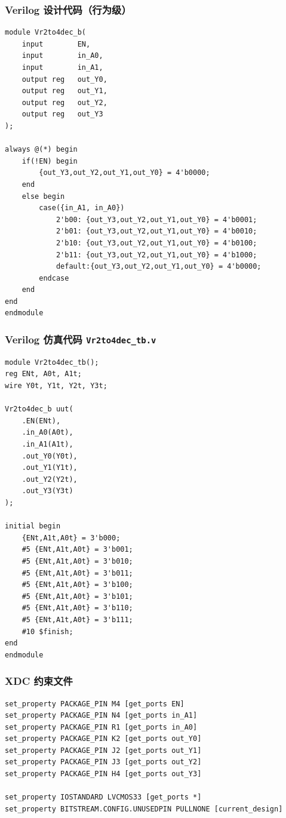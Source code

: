 \documentclass[11pt,a4paper]{article}
\begin{document}
\subsubsection{Verilog 设计代码（行为级）}
\begin{lstlisting}
module Vr2to4dec_b(
    input        EN,
    input        in_A0,
    input        in_A1,
    output reg   out_Y0,
    output reg   out_Y1,
    output reg   out_Y2,
    output reg   out_Y3
);

always @(*) begin
    if(!EN) begin
        {out_Y3,out_Y2,out_Y1,out_Y0} = 4'b0000;
    end
    else begin
        case({in_A1, in_A0})
            2'b00: {out_Y3,out_Y2,out_Y1,out_Y0} = 4'b0001;
            2'b01: {out_Y3,out_Y2,out_Y1,out_Y0} = 4'b0010;
            2'b10: {out_Y3,out_Y2,out_Y1,out_Y0} = 4'b0100;
            2'b11: {out_Y3,out_Y2,out_Y1,out_Y0} = 4'b1000;
            default:{out_Y3,out_Y2,out_Y1,out_Y0} = 4'b0000;
        endcase
    end
end
endmodule
\end{lstlisting}

\subsubsection{Verilog 仿真代码 \texttt{Vr2to4dec\_tb.v}}
\begin{lstlisting}
module Vr2to4dec_tb();
reg ENt, A0t, A1t;
wire Y0t, Y1t, Y2t, Y3t;

Vr2to4dec_b uut(
    .EN(ENt),
    .in_A0(A0t),
    .in_A1(A1t),
    .out_Y0(Y0t),
    .out_Y1(Y1t),
    .out_Y2(Y2t),
    .out_Y3(Y3t)
);

initial begin
    {ENt,A1t,A0t} = 3'b000;
    #5 {ENt,A1t,A0t} = 3'b001;
    #5 {ENt,A1t,A0t} = 3'b010;
    #5 {ENt,A1t,A0t} = 3'b011;
    #5 {ENt,A1t,A0t} = 3'b100;
    #5 {ENt,A1t,A0t} = 3'b101;
    #5 {ENt,A1t,A0t} = 3'b110;
    #5 {ENt,A1t,A0t} = 3'b111;
    #10 $finish;
end
endmodule
\end{lstlisting}

\subsubsection{XDC 约束文件}
\begin{lstlisting}
set_property PACKAGE_PIN M4 [get_ports EN]
set_property PACKAGE_PIN N4 [get_ports in_A1]
set_property PACKAGE_PIN R1 [get_ports in_A0]
set_property PACKAGE_PIN K2 [get_ports out_Y0]
set_property PACKAGE_PIN J2 [get_ports out_Y1]
set_property PACKAGE_PIN J3 [get_ports out_Y2]
set_property PACKAGE_PIN H4 [get_ports out_Y3]

set_property IOSTANDARD LVCMOS33 [get_ports *]
set_property BITSTREAM.CONFIG.UNUSEDPIN PULLNONE [current_design]
\end{lstlisting}
\end{document}

